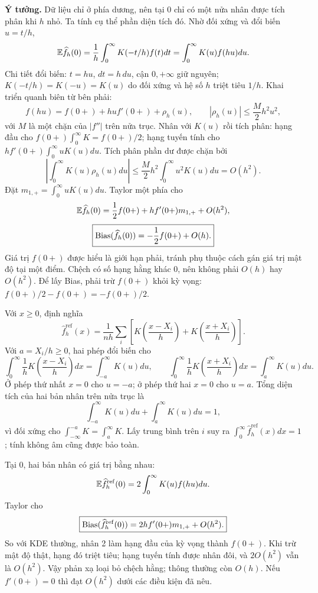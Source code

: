 \textbf{Ý tưởng.} Dữ liệu chỉ ở phía dương, nên tại 0 chỉ có một nửa nhân
được tích phân khi $h$ nhỏ. Ta tính cụ thể phần diện tích đó.
Nhờ đối xứng và đổi biến $u=t/h$,
\[
\mathbb E\widehat f_h(0)=\frac1h\int_0^\infty K(-t/h)f(t)dt
=\int_0^\infty K(u)f(hu)du.
\]
Chi tiết đổi biến: $t=hu$, $dt=h\,du$, cận $0,+\infty$ giữ nguyên;
$K(-t/h)=K(-u)=K(u)$ do đối xứng và hệ số $h$ triệt tiêu $1/h$.
Khai triển quanh biên từ bên phải:
\[
f(hu)=f(0+)+hu f'(0+)+\rho_h(u),\qquad
|\rho_h(u)|\leq\frac M2h^2u^2,
\]
với $M$ là một chặn của $|f''|$ trên nửa trục.
Nhân với $K(u)$ rồi tích phân: hạng đầu cho
$f(0+)\int_0^\infty K=f(0+)/2$; hạng tuyến tính cho
$h f'(0+)\int_0^\infty uK(u)du$.
Tích phân phần dư được chặn bởi
\[
\left|\int_0^\infty K(u)\rho_h(u)du\right|
\leq\frac M2h^2\int_0^\infty u^2K(u)du=O(h^2).
\]
Đặt $m_{1,+}=\int_0^\infty uK(u)du$. Taylor một phía cho
\[
\mathbb E\widehat f_h(0)=\frac12f(0+)+h f'(0+)m_{1,+}+O(h^2),
\]
\[
\boxed{\operatorname{Bias}(\widehat f_h(0))=-\frac12f(0+)+O(h).}
\]
Giá trị $f(0+)$ được hiểu là giới hạn phải, tránh phụ thuộc cách gán giá trị mật độ tại một điểm.
Chệch có số hạng hằng khác 0, nên không phải $O(h)$ hay $O(h^2)$.
Để lấy Bias, phải trừ $f(0+)$ khỏi kỳ vọng:
$f(0+)/2-f(0+)=-f(0+)/2$.

Với $x\geq0$, định nghĩa
\[
\widehat f_h^{\mathrm{ref}}(x)=\frac1{nh}\sum_i
\left[K\left(\frac{x-X_i}{h}\right)+K\left(\frac{x+X_i}{h}\right)\right].
\]
Với $a=X_i/h\geq0$, hai phép đổi biến cho
\[
\int_0^\infty\frac1hK\left(\frac{x-X_i}{h}\right)dx
=\int_{-a}^\infty K(u)du,
\qquad
\int_0^\infty\frac1hK\left(\frac{x+X_i}{h}\right)dx
=\int_a^\infty K(u)du.
\]
Ở phép thứ nhất $x=0$ cho $u=-a$; ở phép thứ hai $x=0$ cho $u=a$.
Tổng diện tích của hai bản nhân trên nửa trục là
\[
\int_{-a}^\infty K(u)du+\int_a^\infty K(u)du=1,
\]
vì đối xứng cho $\int_{-\infty}^{-a}K=\int_a^\infty K$.
Lấy trung bình trên $i$ suy ra
$\int_0^\infty\widehat f_h^{\mathrm{ref}}(x)dx=1$;
tính không âm cũng được bảo toàn.

Tại 0, hai bản nhân có giá trị bằng nhau:
\[
\mathbb E\widehat f_h^{\mathrm{ref}}(0)=2\int_0^\infty K(u)f(hu)du.
\]
Taylor cho
\[
\boxed{\operatorname{Bias}(\widehat f_h^{\mathrm{ref}}(0))
=2h f'(0+)m_{1,+}+O(h^2).}
\]
So với KDE thường, nhân 2 làm hạng đầu của kỳ vọng thành $f(0+)$.
Khi trừ mật độ thật, hạng đó triệt tiêu; hạng tuyến tính được nhân đôi,
và $2O(h^2)$ vẫn là $O(h^2)$.
Vậy phản xạ loại bỏ chệch hằng; thông thường còn $O(h)$.
Nếu $f'(0+)=0$ thì đạt $O(h^2)$ dưới các điều kiện đã nêu.

